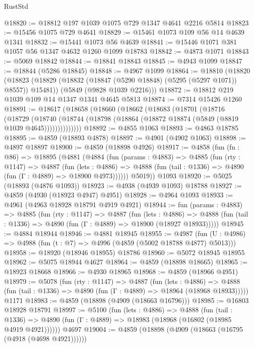 \begin{lexlean}{RustStd}
\begin{coremodule}
@18820 := @18812 @197 @1039 @1075 @729 @1347 @4641 @2216 @5814
@18823 := @15456 @1075 @729 @4641
@18829 := @15461 @1073 @109 @56 @14 @4639 @1341
@18832 := @15441 @1073 @56 @4639
@18841 := @15446 @1071 @381 @1057 @56 @1347 @4632 @1260 @1099 @18783
@18842 := @4873 @1071
@18843 := @5069 @18842
@18844 := @18841 @18843
@18845 := @4943 @1099
@18847 := @18844 (@5286 @18845)
@18848 := @4967 @1099
@18864 := @18810
    (@18820
      (@18823 (@18829 (@18832 (@18847 (@5290 @18848) (@5295 (@5297 @1071)) @8557)) @15481))
      (@5849 (@9828 @1039 @2216)))
@18872 := @18812 @219 @1039 @109 @14 @1347 @1341 @4645 @5813
@18874 := @7314 @15426 @1260
@18891 := @18617
    (@18658
      (@18660
        (@18662
          (@18683
            (@18701
              (@18716
                (@18729
                  (@18740
                    (@18744 (@18798 (@18864 (@18872 @18874 (@5849 (@8819 @1039 @4645))))))))))))))
@18892 := @4855 @1063
@18893 := @4863 @18785
@18895 := @4859 (@18893 @4878)
@18897 := @4901 (@4902 @1063)
@18898 := @4897 @18897
@18900 := @4859 (@18898 @4926)
@18917 := @4858
    (fun (fn : @86) =>
    @18895
      (@4881
        (@4884
          (fun (params : @4883) =>
          @4885
            (fun (rty : @1147) =>
            @4887
              (fun (lets : @4886) =>
              @4888 (fun (tail : @1336) => @4890 (fun (Γ : @4889) => @18900 @4973))))))
        @5019))
    @1093
@18920 := @5025 (@18893 (@4876 @1093))
@18923 := @4938 (@4939 @1093) @18788
@18927 := @4859 (@4930 (@18923 @4947) @4951)
@18928 := @4964 @1093
@18933 := @4961 (@4963 @18928 @18791 @4919 @4921)
@18944 := fun (params : @4883) =>
  @4885
    (fun (rty : @1147) =>
    @4887
      (fun (lets : @4886) =>
      @4888 (fun (tail : @1336) => @4890 (fun (Γ : @4889) => @18900 (@18927 @18933)))))
@18945 := @4884 @18944
@18946 := @4881 @18945
@18955 := @4987
    (fun (U : @4986) => @4988 (fun (t : @7) => @4996 (@4859 (@5002 @18788 @4877) @5013)))
@18958 := @18920 (@18946 @18955) @18786
@18960 := @5072 @18945 @18955
@18962 := @5075 @18944 @4627
@18964 := @4859 (@18898 @18665)
@18965 := @18923 @18668
@18966 := @4930 @18965
@18968 := @4859 (@18966 @4951)
@18979 := @5078
    (fun (rty : @1147) =>
    @4887
      (fun (lets : @4886) =>
      @4888 (fun (tail : @1336) => @4890 (fun (Γ : @4889) => @18964 (@18968 @18933)))))
    @1171
@18983 := @4859 (@18898 (@4909 (@18663 @16796)))
@18985 := @16803 @18928 @18791
@18997 := @5100
    (fun (lets : @4886) =>
    @4888
      (fun (tail : @1336) =>
      @4890 (fun (Γ : @4889) => @18983 (@18968 (@16802 (@18985 @4919 @4921))))))
    @4697
@19004 := @4859 (@18898 (@4909 (@18663 (@16795 (@4918 (@4698 @4921))))))

\end{coremodule}
\end{lexlean}
